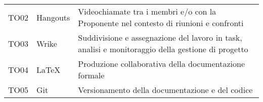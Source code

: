 \documentclass[./../Technology Baseline.tex]{subfiles}
\begin{document}
\begin{longtable}{| p{2cm} | p{3.5cm} |p{7cm} |}
	\newline TO02&
	\newline Hangouts&
	\newline Videochiamate tra i membri e/o con la Proponente nel contesto di riunioni e confronti \newline
	\\[1em]
	
	\newline TO03&
	\newline Wrike&
	\newline Suddivisione e assegnazione del lavoro in task, analisi e monitoraggio della gestione di progetto \newline
	\\[1em]
	
	\newline TO04&
	\newline LaTeX&
	\newline Produzione collaborativa della documentazione formale \newline
	\\[1em]
	
	\newline TO05&
	\newline Git&
	\newline Versionamento della documentazione e del codice \newline
	\\[1em]
	\hline
\end{longtable}

\newpage
\end{document}
